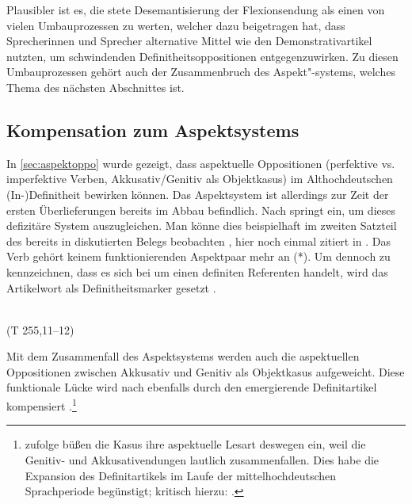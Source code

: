 Plausibler ist es, die stete Desemantisierung der Flexionsendung als einen von vielen Umbauprozessen zu werten, welcher dazu beigetragen hat, dass Sprecherinnen und Sprecher alternative Mittel wie den Demonstrativartikel nutzten, um schwindenden Definitheitsoppositionen entgegenzuwirken. Zu diesen Umbauprozessen gehört auch der Zusammenbruch des Aspekt"-systems, welches Thema des nächsten Abschnittes ist.

\subsection{Kompensation zum Aspektsystems} \label{aspekt}

In \ref{sec:aspektoppo} wurde gezeigt, dass aspektuelle Oppositionen (perfektive vs. imperfektive Verben, Akkusativ/Genitiv als Objektkasus) im Althochdeutschen (In-)Definitheit bewirken können. Das Aspektsystem ist allerdings zur Zeit der ersten Überlieferungen bereits im Abbau befindlich. Nach  \textcite{Leiss1994,Leiss2000,Leiss2010} springt  ein, um dieses defizitäre System auszugleichen. Man könne dies beispielhaft im zweiten Satzteil des bereits in  diskutierten Belegs beobachten \parencite[180f.]{Leiss2000}, hier noch einmal zitiert in . Das Verb  gehört keinem funktionierenden Aspektpaar mehr an (*). Um dennoch zu kennzeichnen, dass es sich bei  um einen definiten Referenten handelt, wird das Artikelwort  als Definitheitsmarker gesetzt \parencite[181]{Leiss2000}.


\begin{exe}
	\ex \label{ex:bilan}   \\   (T 255,11--12)
\end{exe}
\noindent
Mit dem Zusammenfall des Aspektsystems werden auch die aspektuellen Oppositionen zwischen Akkusativ und Genitiv als Objektkasus aufgeweicht. Diese funktionale Lücke wird nach \textcite[187ff.]{Leiss2000} ebenfalls durch den emergierende Definitartikel kompensiert \parencite[vgl. auch][46f.]{Abraham1997}.\footnote{\textcite[88f.]{Philippi1997} zufolge büßen die Kasus ihre aspektuelle Lesart deswegen ein, weil die Genitiv- und Akkusativendungen lautlich zusammenfallen. Dies habe die Expansion des Definitartikels im Laufe der mittelhochdeutschen Sprachperiode begünstigt; kritisch hierzu: \textcite[234f.]{Lyons1999}.}

